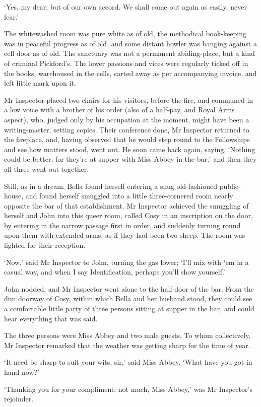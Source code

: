 ‘Yes, my dear; but of our own accord. We shall come out again as easily,
never fear.’

The whitewashed room was pure white as of old, the methodical
book-keeping was in peaceful progress as of old, and some distant howler
was banging against a cell door as of old. The sanctuary was not a
permanent abiding-place, but a kind of criminal Pickford’s. The lower
passions and vices were regularly ticked off in the books, warehoused in
the cells, carted away as per accompanying invoice, and left little mark
upon it.

Mr Inspector placed two chairs for his visitors, before the fire, and
communed in a low voice with a brother of his order (also of a half-pay,
and Royal Arms aspect), who, judged only by his occupation at the
moment, might have been a writing-master, setting copies. Their
conference done, Mr Inspector returned to the fireplace, and, having
observed that he would step round to the Fellowships and see how matters
stood, went out. He soon came back again, saying, ‘Nothing could be
better, for they’re at supper with Miss Abbey in the bar;’ and then they
all three went out together.

Still, as in a dream, Bella found herself entering a snug old-fashioned
public-house, and found herself smuggled into a little three-cornered
room nearly opposite the bar of that establishment. Mr Inspector
achieved the smuggling of herself and John into this queer room, called
Cosy in an inscription on the door, by entering in the narrow passage
first in order, and suddenly turning round upon them with extended arms,
as if they had been two sheep. The room was lighted for their reception.

‘Now,’ said Mr Inspector to John, turning the gas lower; ‘I’ll mix with
‘em in a casual way, and when I say Identification, perhaps you’ll show
yourself.’

John nodded, and Mr Inspector went alone to the half-door of the bar.
From the dim doorway of Cosy, within which Bella and her husband stood,
they could see a comfortable little party of three persons sitting at
supper in the bar, and could hear everything that was said.

The three persons were Miss Abbey and two male guests. To whom
collectively, Mr Inspector remarked that the weather was getting sharp
for the time of year.

‘It need be sharp to suit your wits, sir,’ said Miss Abbey. ‘What have
you got in hand now?’

‘Thanking you for your compliment: not much, Miss Abbey,’ was Mr
Inspector’s rejoinder.

